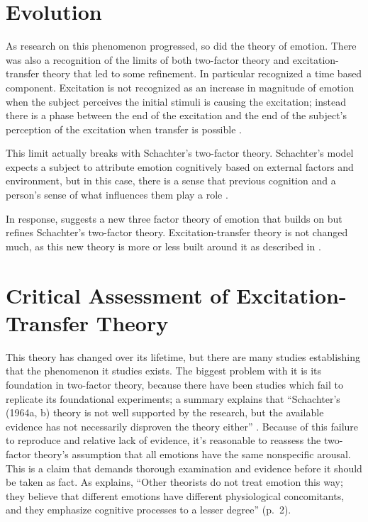 \documentclass[
  stu]{apa7}
\begin{document}
\hypertarget{evolution}{%
\section{Evolution}\label{evolution}}

As research on this phenomenon progressed, so did the theory of emotion.
There was also a recognition of the limits of both two-factor theory and
excitation-transfer theory that led to some refinement. In particular
\textcite{canEnhancementExperiencedSexual} recognized a time based
component. Excitation is not recognized as an increase in magnitude of
emotion when the subject perceives the initial stimuli is causing the
excitation; instead there is a phase between the end of the excitation
and the end of the subject's perception of the excitation when transfer
is possible \autocite{canEnhancementExperiencedSexual}.

This limit actually breaks with Schachter's two-factor theory.
Schachter's model expects a subject to attribute emotion cognitively
based on external factors and environment, but in this case, there is a
sense that previous cognition and a person's sense of what influences
them play a role \autocite[ 40]{bryExcitationTransferTheoryThreeFactor}.

In response, \textcite{tanEmotionalArousalFacilitation} suggests a new
three factor theory of emotion that builds on but refines Schachter's
two-factor theory. Excitation-transfer theory is not changed much, as
this new theory is more or less built around it as described in
\textcite{canEnhancementExperiencedSexual}.

\hypertarget{critical-assessment-of-excitation-transfer-theory}{%
\section{Critical Assessment of Excitation-Transfer
Theory}\label{critical-assessment-of-excitation-transfer-theory}}

This theory has changed over its lifetime, but there are many studies
establishing that the phenomenon it studies exists. The biggest problem
with it is its foundation in two-factor theory, because there have been
studies which fail to replicate its foundational experiments; a summary
explains that ``Schachter's (1964a, b) theory is not well supported by
the research, but the available evidence has not necessarily disproven
the theory either'' \autocite[ 1]{cotReviewResearchSchachter}. Because
of this failure to reproduce and relative lack of evidence, it's
reasonable to reassess the two-factor theory's assumption that all
emotions have the same nonspecific arousal. This is a claim that demands
thorough examination and evidence before it should be taken as fact. As
\textcite{cotReviewResearchSchachter} explains, ``Other theorists do not
treat emotion this way; they believe that different emotions have
different physiological concomitants, and they emphasize cognitive
processes to a lesser degree'' (p.~2).
\end{document}
